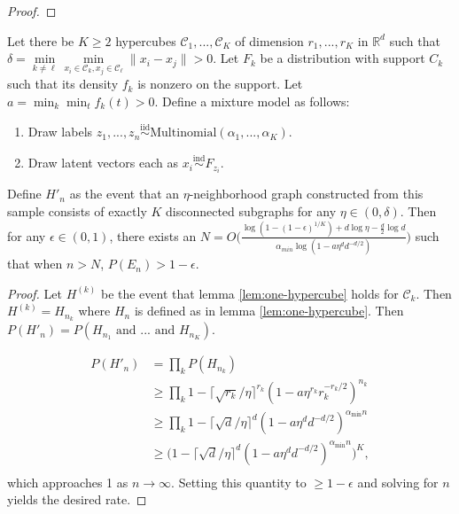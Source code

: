 \documentclass[12pt]{article}
\begin{document}
\begin{proof}
\end{proof}

\begin{lemma}
\label{lem:K-hypercubes}
Let there be $K \geq 2$ hypercubes $\mathcal{C}_1, ..., \mathcal{C}_K$ of dimension $r_1, ..., r_K$ in $\mathbb{R}^d$ such that $\delta = \min\limits_{k \neq \ell} \min\limits_{x_i \in \mathcal{C}_k, x_j \in \mathcal{C}_\ell} \|x_i - x_j\| > 0$. 
Let $F_k$ be a distribution with support $C_k$ such that its density $f_k$ is nonzero on the support. Let $a = \min_k \min_t f_k(t) > 0$. 
Define a mixture model as follows: 

\begin{enumerate}
  \item Draw labels $z_1, ..., z_n \stackrel{\mathrm{iid}}{\sim}\mathrm{Multinomial}(\alpha_1, ..., \alpha_K)$. 
  \item Draw latent vectors each as $x_i \stackrel{\mathrm{ind}}{\sim}F_{z_i}$.
\end{enumerate}

Define $H'_n$ as the event that an $\eta$-neighborhood graph constructed from this sample consists of exactly $K$ disconnected subgraphs for any $\eta \in (0, \delta)$. 
Then for any $\epsilon \in (0, 1)$, there exists an $N = O \Big( \frac{\log(1 - (1 - \epsilon)^{1/K}) + d \log \eta - \frac{d}{2} \log d}{\alpha_{min} \log(1 - a \eta^d d^{-d/2})} \Big)$ such that when $n > N$, $P(E_n) > 1 - \epsilon$. 
\end{lemma}

\begin{proof}
Let $H^{(k)}$ be the event that lemma \ref{lem:one-hypercube} holds for $\mathcal{C}_k$. Then $H^{(k)} = H_{n_k}$ where $H_n$ is defined as in lemma \ref{lem:one-hypercube}. 
Then $P(H'_n) = P(H_{n_1} \text{ and } ... \text{ and } H_{n_K})$. 

$$
\begin{aligned}
P(H'_n) & = \prod_k P(H_{n_k}) \\
& \geq \prod_k 1 - \lceil \sqrt{r_k} / \eta \rceil^{r_k} (1 - a \eta^{r_k} r_k^{-r_k/2})^{n_k} \\
& \geq \prod_k 1 - \lceil \sqrt{d} / \eta \rceil^{d} (1 - a \eta^{d} d^{-d/2})^{\alpha_{\min} n} \\
& \geq \big(1 - \lceil \sqrt{d} / \eta \rceil^{d} (1 - a \eta^{d} d^{-d/2})^{\alpha_{\min} n} \big)^K, \\
\end{aligned}
$$
which approaches 1 as $n \to \infty$. 
Setting this quantity to $\geq 1 - \epsilon$ and solving for $n$ yields the desired rate. 
\end{proof}
\end{document}
